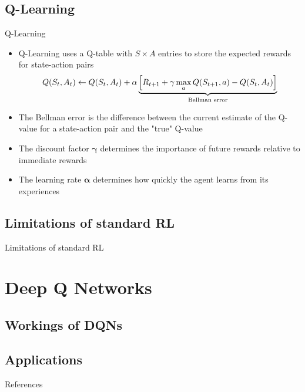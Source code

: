 \documentclass[xcolor=dvipsnames]{beamer}
\begin{document}
\subsection{Q-Learning}
\begin{frame}{Q-Learning}
    \begin{itemize}
        \item \alert{Q-Learning} uses a Q-table with $S \times A$ entries to store the expected rewards for state-action pairs
        \begin{equation*}
            Q(S_t, A_t) \leftarrow Q(S_t, A_t) + \alpha \underbrace{\Bigl[R_{t+1} + \gamma \max_a Q(S_{t+1}, a) - Q(S_t, A_t)\Bigr]}_\text{Bellman error}
        \end{equation*}
        \item The \alert{Bellman error} is the difference between the current estimate of the Q-value for a state-action pair and the "true" Q-value
        \item The discount factor $\boldsymbol{\gamma}$ determines the importance of future rewards relative to immediate rewards
        \item The learning rate $\boldsymbol{\alpha}$ determines how quickly the agent learns from its experiences
    \end{itemize}
\end{frame}


\subsection{Limitations of standard RL}
\begin{frame}{Limitations of standard RL}
    
\end{frame}

\section{Deep Q Networks}
\subsection{Workings of DQNs}
\subsection{Applications}

\begin{frame}[allowframebreaks]{References}


\end{frame}
\end{document}
